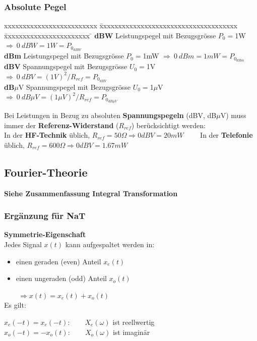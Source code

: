 \subsubsection{Absolute Pegel}
	\begin{tabbing}
	xxxxxxxxxxxxxxxxxxxxxxxxx \= xxxxxxxxxxxxxxxxxxxxxxxxxxxxxxxxxxxxx  \= xxxxxxxxxxxxxxxxxxxxxxx \=\kill
	\textbf{dBW} \> Leistungspegel mit Bezugsgrösse $P_0 = $1W \> $\Longrightarrow \: 0 \: dBW = 1W = P_{0_{dBW}}$\\
	\textbf{dBm} \> Leistungspegel mit Bezugsgrösse $P_0 = $1mW \> $\Longrightarrow \: 0 \: dBm = 1mW = P_{0_{dBm}}$\\
	\textbf{dBV} \> Spannungspegel mit Bezugsgrösse $U_0 = $1V \> $\Longrightarrow \: 0 \: dBV = (1V)^2/R_{ref} = P_{0_{dBV}}$\\
	\textbf{dB}$\mu$V \> Spannungspegel mit Bezugsgrösse $U_0 = $1$\mu$V \> $\Longrightarrow \: 0 \: dB \mu V = (1 \mu V)^2/R_{ref} = P_{0_{dB\mu V}}$
	\end{tabbing}
Bei Leistungen in Bezug zu absoluten \textbf{Spannungspegeln} (dBV, dB$\mu$V) muss immer der \textbf{Referenz-Widerstand} ($R_{ref}$) berücksichtigt werden: \\
In der \textbf{HF-Technik} üblich, $R_{ref} = 50 \Omega \Rightarrow 0 dBV = 20 mW \qquad $
In der \textbf{Telefonie} üblich, $R_{ref} = 600  \Omega \Rightarrow 0 dBV =
1.67 mW$ 

\subsection{Fourier-Theorie}
	 \textbf{Siehe Zusammenfassung Integral Transformation}

\subsubsection{Ergänzung für NaT}
	\textbf{Symmetrie-Eigenschaft}\\
		Jedes Signal $x(t)$ kann aufgespaltet werden in:
		\parbox{6.5cm}{
			\begin{itemize}
				\item einen geraden (even) Anteil $x_e(t)$
				\item einen ungeraden (odd) Anteil $x_o(t)$
			\end{itemize}
		}
		$\qquad \Rightarrow x(t) = x_e(t) + x_o(t)$\\
		Es gilt:  $\quad$
		\parbox[t]{7cm}{
			$x_e(-t) = x_e(-t) : \qquad X_e(\omega)$ ist reellwertig\\
			\hspace{1cm} $x_o(-t) = -x_o(t) : \qquad X_o(\omega)$ ist imaginär
		}\\
		
